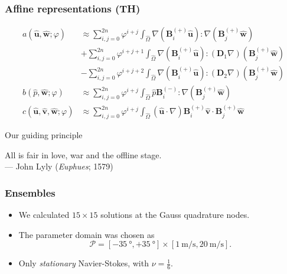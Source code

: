 \documentclass{beamer}
\begin{document}
\begin{frame}
  \frametitle{Affine representations (TH)}

  \begin{align*}
    a(\hat{\bm u}, \hat{\bm w}; \varphi)
    &\approx \sum_{i,j=0}^{2n} \varphi^{i+j} \int_{\hat{\Omega}}
      \nabla (\bm B^{(+)}_i \hat{\bm u}) : \nabla (\bm B^{(+)}_j \hat{\bm w}) \\
    &+ \sum_{i,j=0}^{2n} \varphi^{i+j+1} \int_{\hat{\Omega}}
      \nabla (\bm B^{(+)}_i \hat{\bm u}) : (\bm D_1 \nabla) (\bm B^{(+)}_j \hat{\bm w}) \\
    &- \sum_{i,j=0}^{2n} \varphi^{i+j+2} \int_{\hat{\Omega}}
      \nabla (\bm B^{(+)}_i \hat{\bm u}) : (\bm D_2 \nabla) (\bm B^{(+)}_j \hat{\bm w}) \\
    b(\hat{p}, \hat{\bm w}; \varphi) &\approx \sum_{i,j=0}^{2n} \varphi^{i+j}
      \int_{\hat{\Omega}} \hat{p} \bm B^{(-)}_i :
      \nabla \left( \bm B^{(+)}_j \hat{\bm w} \right) \\
  c(\hat{\bm u}, \hat{\bm v}, \hat{\bm w}; \varphi)
  &\approx \sum_{i,j=0}^{2n} \varphi^{i+j}
    \int_{\hat{\Omega}} (\hat{\bm u} \cdot \nabla) \bm B^{(+)}_i \hat{\bm v} \cdot \bm B^{(+)}_j \hat{\bm w}
  \end{align*}
\end{frame}

\begin{frame}
  \begin{block}{\centering Our guiding principle}
    \begin{center}
      \vspace{5mm}
      All is fair in love, war and the offline stage. \\
      --- John Lyly (\emph{Euphues}; 1579)
      \vspace{5mm}
    \end{center}
  \end{block}
\end{frame}

\begin{frame}
  \frametitle{Ensembles}

  \begin{itemize}
  \item We calculated $15 \times 15$ solutions at the Gauss quadrature nodes.
  \item The parameter domain was chosen as
    \[
      \mathcal{P} = [-\SI{35}{\degree}, +\SI{35}{\degree}] \times
      [\SI{1}{\meter/\second}, \SI{20}{\meter/\second}].
    \]
  \item Only \emph{stationary} Navier-Stokes, with $\nu = \frac{1}{6}$.
  \end{itemize}
\end{frame}
\end{document}
